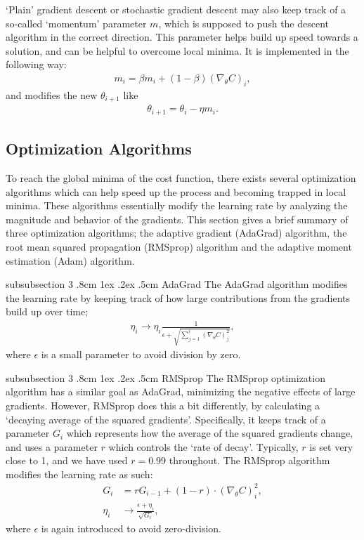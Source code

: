 \documentclass[%
reprint,s
amsmath,amssymb,
aps,
]{revtex4-2}
\makeatletter
\renewcommand{\subsubsection}{%
	\@startsection
	{subsubsection}%
	{3}%
	{\z@}%
	{.8cm \@plus1ex \@minus .2ex}%
	{.5cm}%
	{\normalfont\small\centering}%
}
\makeatother
\begin{document}
`Plain' gradient descent or stochastic gradient descent may also keep track of a so-called `momentum' parameter \(m\), which is supposed to push the descent algorithm in the correct direction. This parameter helps build up speed towards a solution, and can be helpful to overcome local minima. It is implemented in the following way:
\begin{align}
	m_i = \beta m_i + (1-\beta)(\nabla_{\theta}C)_i,
\end{align}
and modifies the new \(\theta_{i+1}\) like 
\begin{align}
	\theta_{i+1} = \theta_{i} - \eta m_i.
\end{align}


\subsection{Optimization Algorithms} \label{sec:optimization_algorithms}
To reach the global minima of the cost function, there exists several optimization algorithms which can help speed up the process and becoming trapped in local minima. These algorithms essentially modify the learning rate by analyzing the magnitude and behavior of the gradients. This section gives a brief summary of three optimization algorithms; the adaptive gradient (AdaGrad) algorithm, the root mean squared propagation (RMSprop) algorithm and the adaptive moment estimation (Adam) algorithm. 


\subsubsection{AdaGrad}
The AdaGrad algorithm modifies the learning rate by keeping track of how large contributions from the gradients build up over time;
\begin{align}
	\eta_i \rightarrow \eta_i \frac{1}{\epsilon + \sqrt{\sum_{j=1}^{i}(\nabla_{\theta}C)_{j}^{2}}},
\end{align}
where \(\epsilon\) is a small parameter to avoid division by zero.

\subsubsection{RMSprop}
The RMSprop optimization algorithm has a similar goal as AdaGrad, minimizing the negative effects of large gradients. However, RMSprop does this a bit differently, by calculating a `decaying average of the squared gradients'. Specifically, it keeps track of a parameter \(G_i\) which represents how the average of the squared gradients change, and uses a parameter \(r\) which controls the `rate of decay'. Typically, \(r\) is set very close to 1, and we have used \(r=0.99\) throughout. The RMSprop algorithm modifies the learning rate as such:
\begin{align}
	G_i &= r G_{i-1} + (1 - r) \cdot (\nabla_{\theta}C)_{i}^{2}, \\
	\eta_i &\rightarrow \frac{\epsilon + \eta_i}{\sqrt{G_i}},
\end{align}
where \(\epsilon\) is again introduced to avoid zero-division.
\end{document}
